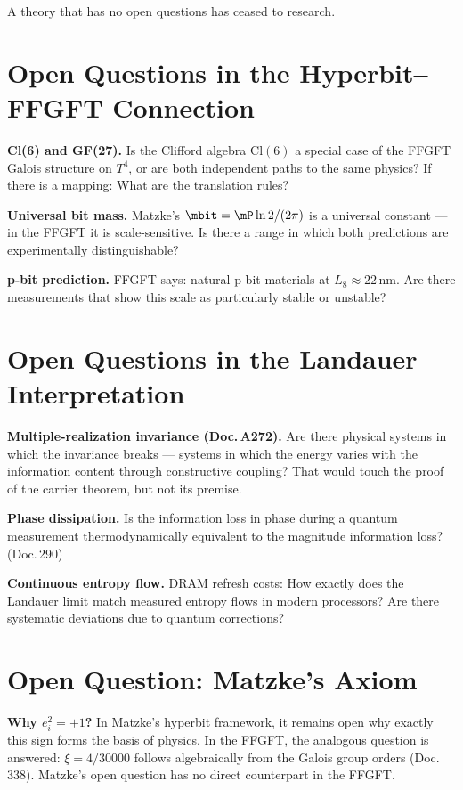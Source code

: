 \label{ch:offene_fragen}

\epigraph{A theory that has no open questions has ceased to research.}{}

\section{Open Questions in the Hyperbit--FFGFT Connection}

\textbf{Cl(6) and GF(27).}
Is the Clifford algebra $\mathrm{Cl}(6)$ a special case of the FFGFT Galois structure
on $T^4$, or are both independent paths to the same physics? If there is a
mapping: What are the translation rules?

\textbf{Universal bit mass.}
Matzke's $\mbit = \mP \ln 2 / (2\pi)$ is a universal constant ---
in the FFGFT it is scale-sensitive. Is there a range in which both
predictions are experimentally distinguishable?

\textbf{p-bit prediction.}
FFGFT says: natural p-bit materials at $L_8 \approx 22\,\text{nm}$.
Are there measurements that show this scale as particularly stable or unstable?

\section{Open Questions in the Landauer Interpretation}

\textbf{Multiple-realization invariance (Doc.\,A272).}
Are there physical systems in which the invariance breaks --- systems in
which the energy varies with the information content through constructive
coupling? That would touch the proof of the carrier theorem, but not
its premise.

\textbf{Phase dissipation.}
Is the information loss in phase during a quantum measurement
thermodynamically equivalent to the magnitude information loss? (Doc.\,290)

\textbf{Continuous entropy flow.}
DRAM refresh costs: How exactly does the Landauer limit match measured
entropy flows in modern processors? Are there systematic
deviations due to quantum corrections?

\section{Open Question: Matzke's Axiom}

\textbf{Why $e_i^2 = +1$?}
In Matzke's hyperbit framework, it remains open why exactly this sign
forms the basis of physics. In the FFGFT, the analogous question is answered:
$\xi = 4/30000$ follows algebraically from the Galois group orders (Doc.\,338).
Matzke's open question has no direct counterpart in the FFGFT.

